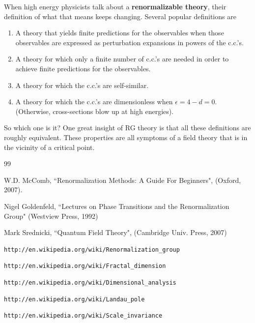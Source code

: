 \documentclass[12pt]{article}
\begin{document}
When high energy physicists
talk about a \textbf{renormalizable theory},
their definition
of what that means keeps changing.
Several popular definitions are
\begin{enumerate}
\item
A theory that yields finite
predictions for the observables
when those observables are expressed
as perturbation
expansions in powers of the c.c.'s.
\item
A theory for which only
a finite number of c.c.'s are needed
in order to achieve finite predictions
for the observables.
\item
A theory for which the c.c.'s are self-similar.
\item
A theory for which the
c.c.'s are dimensionless
when $\epsilon=4-d=0$. (Otherwise,
cross-sections blow up at high energies).
\end{enumerate}
So which one is it?
One great insight of RG theory is
that all these definitions are
roughly equivalent. These
properties
are all symptoms of
a field theory that is in the
vicinity of a critical point.

\begin{thebibliography}{99}

W.D. McComb, ``Renormalization Methods: A Guide For Beginners",
(Oxford, 2007).

Nigel Goldenfeld,
``Lectures on Phase Transitions
and the Renormalization Group" (Westview Press, 1992)

Mark Srednicki,
``Quantum Field Theory",
(Cambridge Univ. Press, 2007)

{\tt http://en.wikipedia.org/wiki/Renormalization\_group}

{\tt http://en.wikipedia.org/wiki/Fractal\_dimension}

{\tt http://en.wikipedia.org/wiki/Dimensional\_analysis}


{\tt http://en.wikipedia.org/wiki/Landau\_pole}


{\tt http://en.wikipedia.org/wiki/Scale\_invariance}


\end{thebibliography}
\end{document}
